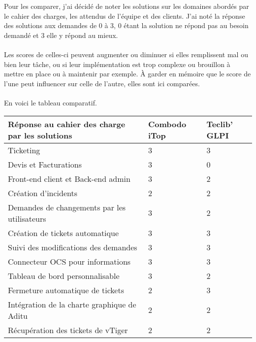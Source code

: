 Pour les comparer, j'ai décidé de noter les solutions sur les domaines abordés par le cahier des charges, les attendus de l'équipe et des clients. J'ai noté la réponse des solutions aux demandes de 0 à 3, 0 étant la solution ne répond pas au besoin demandé et 3 elle y répond au mieux.
\\ \\
Les scores de celles-ci peuvent augmenter ou diminuer si elles remplissent mal ou bien leur tâche, ou si leur implémentation est trop complexe ou brouillon à mettre en place ou à maintenir par exemple. À garder en mémoire que le score de l'une peut influencer sur celle de l'autre, elles sont ici comparées.
\\ \\
En voici le tableau comparatif.
\newpage
\begin{table}[h!]
\begin{tabular}{|l|l|l|}
\hline
Réponse au cahier des charge par les solutions            & Combodo iTop & Teclib' GLPI \\ \hline
Ticketing                                                 & 3            & 3            \\
Devis et Facturations                                     & 3            & 0            \\
Front-end client et Back-end admin                        & 3            & 2            \\
Création d'incidents                                      & 2            & 2            \\
Demandes de changements par les utilisateurs              & 3            & 2            \\
Création de tickets automatique                           & 3            & 3            \\
Suivi des modifications des demandes                      & 3            & 3            \\
Connecteur OCS pour informations                          & 3            & 3            \\
Tableau de bord personnalisable                           & 3            & 2            \\
Fermeture automatique de tickets                          & 2            & 3            \\
Intégration de la charte graphique de Aditu               & 2            & 2            \\
Récupération des tickets de vTiger                        & 2            & 2            \\

\end{tabular}
\end{table}

